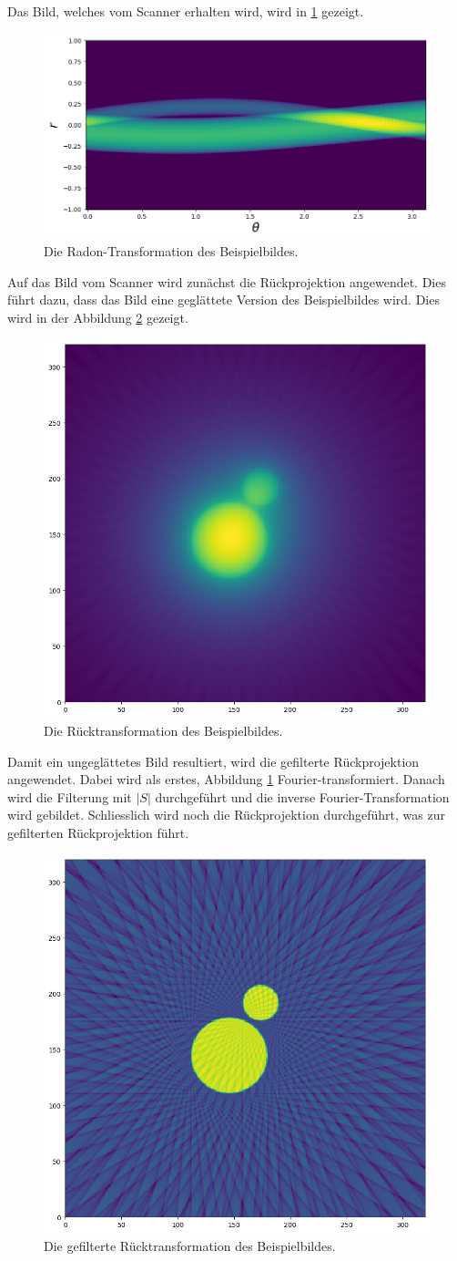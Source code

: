 Das Bild, welches vom Scanner erhalten wird, wird in \ref{ct:img_radon} gezeigt.
\begin{figure}
	\centering
	\includegraphics[width=0.5\linewidth]{papers/ct/images/radon.png}
	\caption{Die Radon-Transformation des Beispielbildes.
		\label{ct:img_radon}}
\end{figure}

Auf das Bild vom Scanner wird zunächst die Rückprojektion angewendet. Dies führt dazu, dass das Bild eine \glqq geglättete\grqq{} Version des Beispielbildes wird. Dies wird in der Abbildung \ref{ct:img_bp} gezeigt.
\begin{figure}
	\centering
	\includegraphics[width=0.5\linewidth]{papers/ct/images/bp.png}
	\caption{Die Rücktransformation des Beispielbildes.
		\label{ct:img_bp}}
\end{figure}

Damit ein ungeglättetes Bild resultiert, wird die gefilterte Rückprojektion angewendet. Dabei wird als erstes, Abbildung \ref{ct:img_radon} Fourier-transformiert. Danach wird die Filterung mit $|S|$ durchgeführt und die inverse Fourier-Transformation wird gebildet. Schliesslich wird noch die Rückprojektion durchgeführt, was zur gefilterten Rückprojektion führt. 

\begin{figure}
	\centering
	\includegraphics[width=0.5\linewidth]{papers/ct/images/fbp.png}
	\caption{Die gefilterte Rücktransformation des Beispielbildes.
		\label{ct:img_fbp}}
\end{figure}

